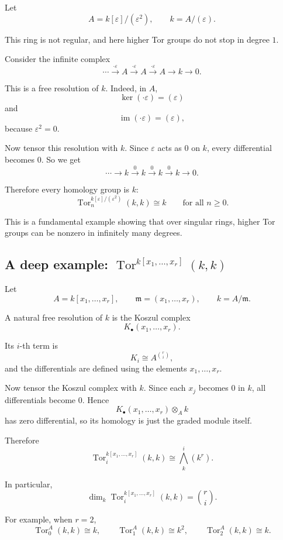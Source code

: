 \documentclass[12pt,a4paper]{article}
\theoremstyle{notespace}
\begin{document}
Let
\[
A=k[\varepsilon]/(\varepsilon^2),
\qquad
k=A/(\varepsilon).
\]

This ring is not regular, and here higher Tor groups do not stop in degree \(1\).

Consider the infinite complex
\[
\cdots \xrightarrow{\cdot \varepsilon} A
\xrightarrow{\cdot \varepsilon} A
\xrightarrow{\cdot \varepsilon} A
\to k\to 0.
\]

This is a free resolution of \(k\). Indeed, in \(A\),
\[
\ker(\cdot \varepsilon)=(\varepsilon)
\]
and
\[
\operatorname{im}(\cdot \varepsilon)=(\varepsilon),
\]
because \(\varepsilon^2=0\).

Now tensor this resolution with \(k\). Since \(\varepsilon\) acts as \(0\) on \(k\), every differential becomes \(0\). So we get
\[
\cdots \to k \xrightarrow{0} k \xrightarrow{0} k \xrightarrow{0} k \to 0.
\]

Therefore every homology group is \(k\):
\[
\operatorname{Tor}_n^{k[\varepsilon]/(\varepsilon^2)}(k,k)\cong k
\qquad
\text{for all } n\geq 0.
\]

This is a fundamental example showing that over singular rings, higher Tor groups can be nonzero in infinitely many degrees.

\subsection{A deep example: \(\operatorname{Tor}^{k[x_1,\dots,x_r]}(k,k)\)}

Let
\[
A=k[x_1,\dots,x_r],
\qquad
\mathfrak m=(x_1,\dots,x_r),
\qquad
k=A/\mathfrak m.
\]

A natural free resolution of \(k\) is the Koszul complex
\[
K_\bullet(x_1,\dots,x_r).
\]

Its \(i\)-th term is
\[
K_i \cong A^{\binom{r}{i}},
\]
and the differentials are defined using the elements \(x_1,\dots,x_r\).

Now tensor the Koszul complex with \(k\). Since each \(x_j\) becomes \(0\) in \(k\), all differentials become \(0\). Hence
\[
K_\bullet(x_1,\dots,x_r)\otimes_A k
\]
has zero differential, so its homology is just the graded module itself.

Therefore
\[
\operatorname{Tor}_i^{k[x_1,\dots,x_r]}(k,k)
\cong
\bigwedge^i_k(k^r).
\]

In particular,
\[
\dim_k \operatorname{Tor}_i^{k[x_1,\dots,x_r]}(k,k)=\binom{r}{i}.
\]

For example, when \(r=2\),
\[
\operatorname{Tor}_0^A(k,k)\cong k,
\qquad
\operatorname{Tor}_1^A(k,k)\cong k^2,
\qquad
\operatorname{Tor}_2^A(k,k)\cong k.
\]
\end{document}
